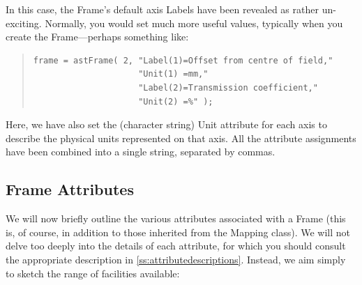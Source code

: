 \documentclass[twoside,11pt]{article}
\newcommand{\htmlref}[2]{#1}
\newcommand{\appref}[1]{Appendix~\ref{#1}}
\renewcommand{\appref}[1]{\ref{#1}}
\begin{document}
In this case, the Frame's default axis Labels have been revealed as
rather un-exciting. Normally, you would set much more useful values,
typically when you create the Frame---perhaps something like:

\begin{quote}
\small
\begin{verbatim}
frame = astFrame( 2, "Label(1)=Offset from centre of field,"
                     "Unit(1) =mm,"
                     "Label(2)=Transmission coefficient,"
                     "Unit(2) =%" );
\end{verbatim}
\normalsize
\end{quote}

Here, we have also set the (character string) Unit attribute for each
axis to describe the physical units represented on that axis. All the
attribute assignments have been combined into a single string,
separated by commas.

\subsection{\label{ss:frameattributes}Frame Attributes}

We will now briefly outline the various attributes associated with a
\htmlref{Frame}{Frame} (this is, of course, in addition to those inherited from the
\htmlref{Mapping}{Mapping} class). We will not delve too deeply into the details of each
attribute, for which you should consult the appropriate description in
\appref{ss:attributedescriptions}. Instead, we aim simply to sketch
the range of facilities available:
\end{document}
